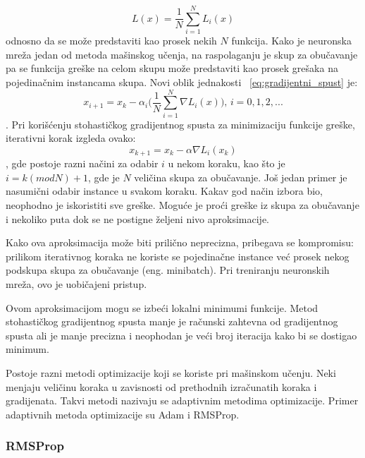 \begin{equation}
		L(x) = \frac{1}{N}\sum_{i=1}^{N} L_i(x)	
\end{equation}
odnosno da se može predstaviti kao prosek nekih $N$ funkcija. Kako je neuronska mreža jedan od metoda mašinskog učenja, na raspolaganju je skup za obučavanje pa se funkcija greške na celom skupu može predstaviti kao prosek grešaka na pojedinačnim instancama skupa. Novi oblik 
jednakosti ~\eqref{eq:gradijentni_spust} je:
\begin{equation}
	x_{i+1} = x_k - \alpha_i \bigg( \frac{1}{N}\sum_{i=1}^{N} \nabla L_i(x) \bigg)\text{,~} i=0,1,2, ... 
\end{equation}.
Pri korišćenju stohastičkog gradijentnog spusta za minimizaciju funkcije greške, iterativni korak izgleda ovako:
\begin{equation}
	x_{k+1} = x_k - \alpha \nabla L_i(x_k) 
\end{equation},
gde postoje razni načini za odabir $i$ u nekom koraku, kao što je $i=k (mod N) + 1$, gde je $N$ veličina skupa za obučavanje. Još jedan primer je nasumični odabir instance u svakom koraku. Kakav god način izbora bio, neophodno je iskoristiti sve greške. Moguće je proći greške iz skupa za obučavanje i nekoliko puta dok se ne postigne željeni nivo aproksimacije. 
\par
Kako ova aproksimacija može biti prilično neprecizna, pribegava se kompromisu: prilikom iterativnog koraka ne koriste se pojedinačne instance već prosek nekog podskupa skupa za obučavanje (eng. minibatch). Pri treniranju neuronskih mreža, ovo je uobičajeni pristup.
\par
Ovom aproksimacijom mogu se izbeći lokalni minimumi funkcije. Metod stohastičkog gradijentnog spusta manje je računski zahtevna od gradijentnog spusta ali je manje precizna i neophodan je veći broj iteracija kako bi se dostigao minimum.
\par
Postoje razni metodi optimizacije koji se koriste pri mašinskom učenju. Neki menjaju veličinu koraka u zavisnosti od prethodnih izračunatih koraka i gradijenata. Takvi metodi nazivaju se adaptivnim metodima optimizacije. Primer adaptivnih metoda optimizacije su Adam i RMSProp.

\subsubsection{RMSProp}

